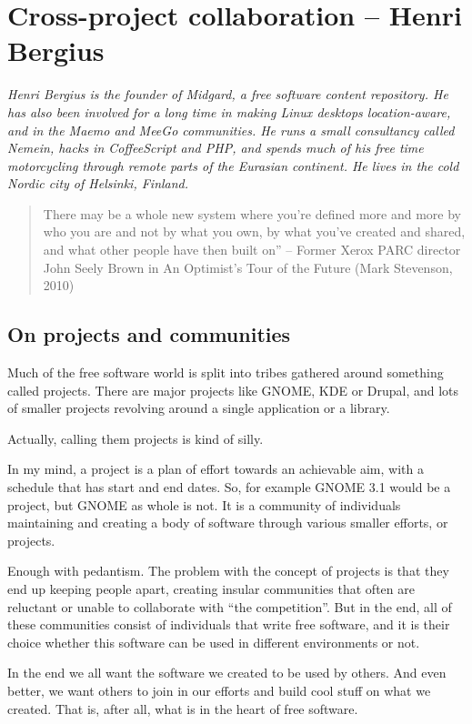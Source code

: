 \chapter{Cross-project collaboration -- Henri Bergius}

\textit{Henri Bergius is the founder of Midgard, a free software content repository. He has also been involved for a long time in making Linux desktops location-aware, and in the Maemo and MeeGo communities. He runs a small consultancy called Nemein, hacks in CoffeeScript and PHP, and spends much of his free time motorcycling through remote parts of the Eurasian continent. He lives in the cold Nordic city of Helsinki, Finland.}

\begin{quote}
There may be a whole new system where you're defined more and more by who you are and not by what you own, by what you've created and shared, and what other people have then built on” -- Former Xerox PARC director John Seely Brown in An Optimist's Tour of the Future (Mark Stevenson, 2010)
\end{quote}

\section*{On projects and communities}

Much of the free software world is split into tribes gathered around something called projects. There are major projects like GNOME, KDE or Drupal, and lots of smaller projects revolving around a single application or a library.

Actually, calling them projects is kind of silly.

In my mind, a project is a plan of effort towards an achievable aim, with a schedule that has start and end dates. So, for example GNOME 3.1 would be a project, but GNOME as whole is not. It is a community of individuals maintaining and creating a body of software through various smaller efforts, or projects.

Enough with pedantism. The problem with the concept of projects is that they end up keeping people apart, creating insular communities that often are reluctant or unable to collaborate with ``the competition''. But in the end, all of these communities consist of individuals that write free software, and it is their choice whether this software can be used in different environments or not.

In the end we all want the software we created to be used by others. And even better, we want others to join in our efforts and build cool stuff on what we created. That is, after all, what is in the heart of free software.

